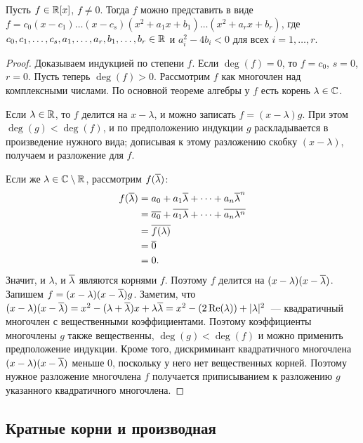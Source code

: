 \begin{theorem}\label{thm_irreducible_real}
Пусть $f\in\mathbb R[x]$, $f\neq 0$. Тогда $f$ можно представить в виде
$f=c_0(x-c_1)\dots (x-c_s)(x^2+a_1x+b_1)\dots(x^2+a_rx+b_r)$, где
$c_0,c_1,\dots,c_s,a_1,\dots,a_r,b_1,\dots,b_r\in\mathbb R$ и $a_i^2-4b_i<0$
для всех $i=1,\dots,r$.
\end{theorem}
\begin{proof}
Доказываем индукцией по степени $f$. Если $\deg(f)=0$, то $f=c_0$,
$s=0$, $r=0$. Пусть теперь $\deg(f)>0$. Рассмотрим $f$ как многочлен
над комплексными числами. По основной теореме алгебры у $f$ есть
корень $\lambda\in\mathbb C$.

Если $\lambda\in\mathbb R$, то $f$ делится на
$x-\lambda$, и можно записать $f=(x-\lambda)g$. При этом
$\deg(g)<\deg(f)$, и по предположению индукции $g$ раскладывается в
произведение нужного вида; дописывая к этому разложению скобку
$(x-\lambda)$, получаем и разложение для $f$.

Если же $\lambda\in\mathbb C\setminus\mathbb R$, рассмотрим $f(\overline{\lambda})$:
\begin{align*}
f(\overline{\lambda})&=a_0+a_1\overline{\lambda}+\dots+a_n\overline{\lambda}^n\\
&=\overline{a_0}+\overline{a_1\lambda}+\dots+\overline{a_n\lambda^n}\\
&=\overline{f(\lambda)}\\
&=\overline{0}\\
&=0.
\end{align*}
Значит, и $\lambda$, и $\overline{\lambda}$ являются корнями $f$. Поэтому
$f$ делится на $(x-\lambda)(x-\overline{\lambda})$. Запишем
$f=(x-\lambda)(x-\overline{\lambda})g$. Заметим, что 
$(x-\lambda)(x-\overline{\lambda})=
x^2-(\lambda+\overline{\lambda})x+\lambda\overline{\lambda}=
x^2-(2\operatorname{Re}(\lambda))+|\lambda|^2$~--- квадратичный многочлен с
вещественными коэффициентами. Поэтому коэффициенты многочлены $g$
также вещественны, $\deg(g)<\deg(f)$ и можно применить предположение
индукции. Кроме того, дискриминант квадратичного многочлена
$(x-\lambda)(x-\overline{\lambda})$ меньше $0$, поскольку у него нет
вещественных корней. Поэтому нужное разложение многочлена $f$
получается приписыванием к разложению $g$ указанного квадратичного
многочлена.
\end{proof}

\subsection{Кратные корни и производная}


